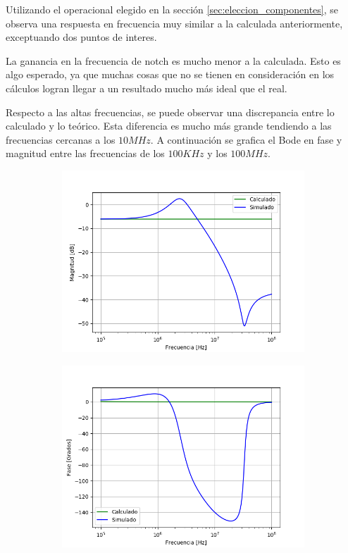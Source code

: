Utilizando el operacional elegido en la sección \ref{sec:eleccion_componentes}, se observa una respuesta en frecuencia muy similar a la calculada anteriormente, exceptuando dos puntos de interes.

La ganancia en la frecuencia de notch es mucho menor a la calculada. Esto es algo esperado, ya que muchas cosas que no se tienen en consideración en los cálculos logran llegar a un resultado mucho más ideal que el real.

Respecto a las altas frecuencias, se puede observar una discrepancia entre lo calculado y lo teórico. Esta diferencia es mucho más grande tendiendo a las frecuencias cercanas a los $10MHz$. A continuación se grafica el Bode en fase y magnitud entre las frecuencias de los $100KHz$ y los $100MHz$.

\begin{figure}[H]
	\centering
	\begin{subfigure}[t]{0.49\textwidth}
	\hspace*{-2cm}
	\centering
		\includegraphics[width=1.3\textwidth]{Imagenes/bodemag_calc_sim_highf.png}
	\end{subfigure}
	\begin{subfigure}[t]{0.49\textwidth}
	\centering
		\includegraphics[width=1.3\textwidth]{Imagenes/bodefase_calc_sim_highf.png}

\end{subfigure}
\end{figure}
